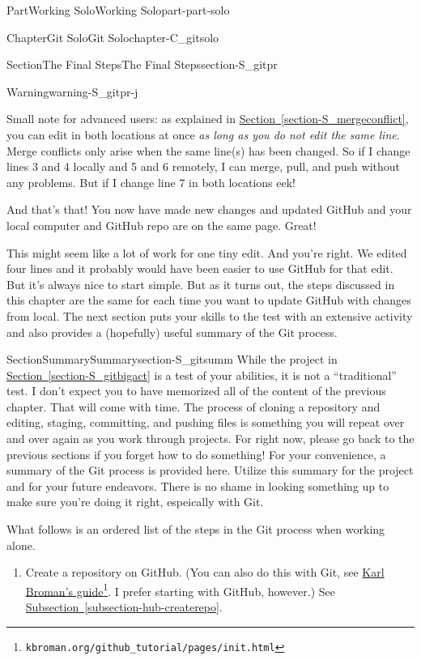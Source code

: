 \documentclass[oneside,10pt,]{book}
\newcommand{\xreffont}{\relax}
\begin{document}
\begin{partptx}{Part}{Working Solo}{}{Working Solo}{}{}{part-part-solo}
\begin{chapterptx}{Chapter}{Git Solo}{}{Git Solo}{}{}{chapter-C_gitsolo}
\begin{sectionptx}{Section}{The Final Steps}{}{The Final Steps}{}{}{section-S_gitpr}
\begin{warning}{Warning}{}{warning-S_gitpr-j}
\par
Small note for advanced users: as explained in \hyperref[section-S_mergeconflict]{Section~{\xreffont\ref{section-S_mergeconflict}}}, you can edit in both locations at once \emph{as long as you do not edit the same line}. Merge conflicts only arise when the same line(s) has been changed. So if I change lines 3 and 4 locally and 5 and 6 remotely, I can merge, pull, and push without any problems. But if I change line 7 in both locations \textellipsis{} eek!%
\end{warning}
And that's that! You now have made new changes and updated GitHub and your local computer and GitHub repo are on the same page. Great!%
\par
This might seem like a lot of work for one tiny edit. And you're right. We edited four lines and it probably would have been easier to use GitHub for that edit. But it's always nice to start simple. But as it turns out, the steps discussed in this chapter are the same for each time you want to update GitHub with changes from local. The next section puts your skills to the test with an extensive activity and also provides a (hopefully) useful summary of the Git process.%
\end{sectionptx}
%
%
\typeout{************************************************}
\typeout{************************************************}
%
\begin{sectionptx}{Section}{Summary}{}{Summary}{}{}{section-S_gitsumm}
%
While the project in \hyperref[section-S_gitbigact]{Section~{\xreffont\ref{section-S_gitbigact}}} is a test of your abilities, it is not a ``traditional'' test. I don't expect you to have memorized all of the content of the previous chapter. That will come with time. The process of cloning a repository and editing, staging, committing, and pushing files is something you will repeat over and over again as you work through projects. For right now, please go back to the previous sections if you forget how to do something! For your convenience, a summary of the Git process is provided here. Utilize this summary for the project and for your future endeavors. There is no shame in looking something up to make sure you're doing it right, espeically with Git.%
\par
What follows is an ordered list of the steps in the Git process when working alone.%
\begin{enumerate}
\item{}Create a repository on GitHub. (You can also do this with Git, see \href{https://kbroman.org/github_tutorial/pages/init.html}{Karl Broman's guide}\footnote{\nolinkurl{kbroman.org/github_tutorial/pages/init.html}\label{fn-S_gitsumm-d-a-a-a-b}}. I prefer starting with GitHub, however.) See \hyperref[subsection-hub-createrepo]{Subsection~{\xreffont\ref{subsection-hub-createrepo}}}.%

\end{enumerate}
\end{sectionptx}
\end{chapterptx}
\end{partptx}
\end{document}
